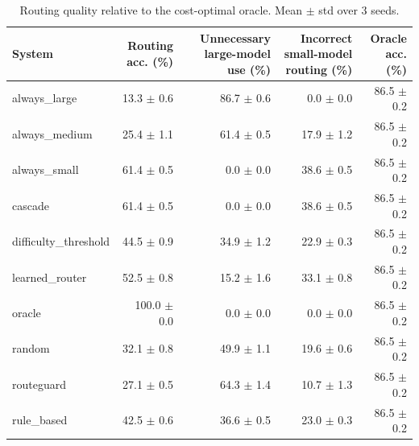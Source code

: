 \begin{table}[t]
\centering
\small
\caption{Routing quality relative to the cost-optimal oracle. Mean $\pm$ std over 3 seeds.}
\label{tab:routing}
\begin{tabular}{lrrrr}
\toprule
System & Routing acc. (\%) & Unnecessary large-model use (\%) & Incorrect small-model routing (\%) & Oracle acc. (\%) \\
\midrule
always\_large & 13.3 $\pm$ 0.6 & 86.7 $\pm$ 0.6 & 0.0 $\pm$ 0.0 & 86.5 $\pm$ 0.2 \\
always\_medium & 25.4 $\pm$ 1.1 & 61.4 $\pm$ 0.5 & 17.9 $\pm$ 1.2 & 86.5 $\pm$ 0.2 \\
always\_small & 61.4 $\pm$ 0.5 & 0.0 $\pm$ 0.0 & 38.6 $\pm$ 0.5 & 86.5 $\pm$ 0.2 \\
cascade & 61.4 $\pm$ 0.5 & 0.0 $\pm$ 0.0 & 38.6 $\pm$ 0.5 & 86.5 $\pm$ 0.2 \\
difficulty\_threshold & 44.5 $\pm$ 0.9 & 34.9 $\pm$ 1.2 & 22.9 $\pm$ 0.3 & 86.5 $\pm$ 0.2 \\
learned\_router & 52.5 $\pm$ 0.8 & 15.2 $\pm$ 1.6 & 33.1 $\pm$ 0.8 & 86.5 $\pm$ 0.2 \\
oracle & 100.0 $\pm$ 0.0 & 0.0 $\pm$ 0.0 & 0.0 $\pm$ 0.0 & 86.5 $\pm$ 0.2 \\
random & 32.1 $\pm$ 0.8 & 49.9 $\pm$ 1.1 & 19.6 $\pm$ 0.6 & 86.5 $\pm$ 0.2 \\
routeguard & 27.1 $\pm$ 0.5 & 64.3 $\pm$ 1.4 & 10.7 $\pm$ 1.3 & 86.5 $\pm$ 0.2 \\
rule\_based & 42.5 $\pm$ 0.6 & 36.6 $\pm$ 0.5 & 23.0 $\pm$ 0.3 & 86.5 $\pm$ 0.2 \\
\bottomrule
\end{tabular}
\end{table}

